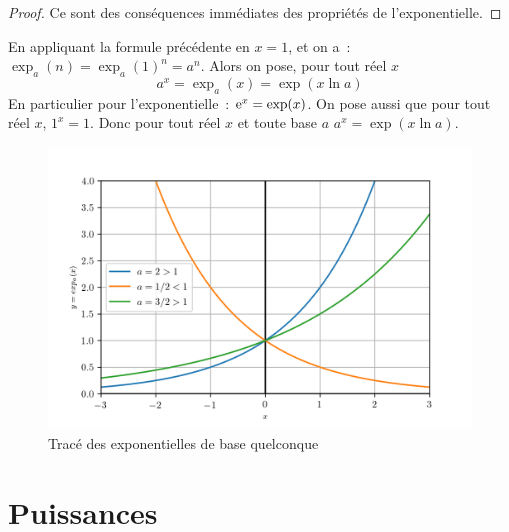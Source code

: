 \begin{proof}
    Ce sont des conséquences immédiates des propriétés de l'exponentielle.
\end{proof}
En appliquant la formule précédente en \(x=1\), et on a~: 
\(\exp_a(n)=\exp_a(1)^n=a^n\). Alors on pose, pour tout réel \(x\)
\begin{equation}
    a^x=\exp_a(x)=\exp(x \ln a)
\end{equation}
En particulier pour l'exponentielle~: \(\operatorname{e}^x=\exp(x)\). On pose aussi que 
pour tout réel \(x\), \(1^x=1\). Donc pour tout réel \(x\) et toute base 
\(a\) \(a^x=\exp(x \ln a)\).
\begin{figure}
    \centering
    \includegraphics[scale=0.8]{expa.png}
    \caption{Tracé des exponentielles de base quelconque}
    \label{fig:traceexpa}
\end{figure}
\section{Puissances}
\label{sec:chap1-puissances}
